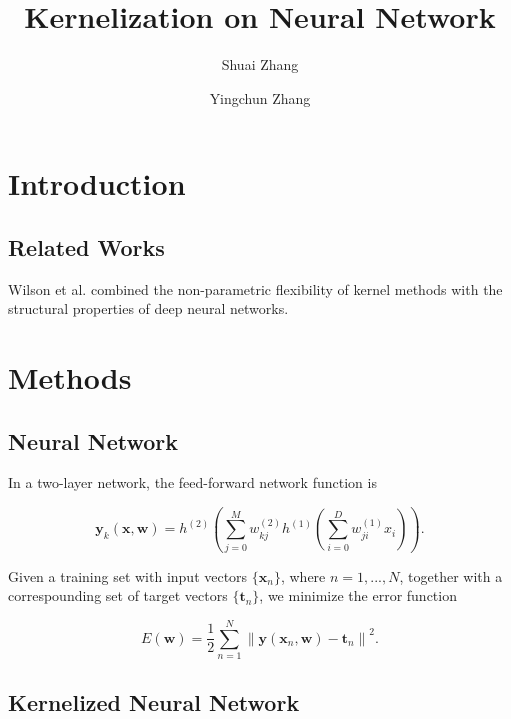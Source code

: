 \documentclass{article}
\begin{document}
\title{Kernelization on Neural Network}
\author{Shuai Zhang\and Yingchun Zhang}
\maketitle

\section{Introduction}

\subsection{Related Works}
Wilson et al. \cite{DBLP:journals/corr/WilsonHSX15} combined the non-parametric flexibility of kernel methods with the structural properties of deep neural networks.

\section{Methods}

\subsection{Neural Network}

In a two-layer network, the feed-forward network function is

\begin{equation}
\mathbf{y}_k(\mathbf{x}, \mathbf{w}) = h^{(2)}\left(\sum_{j=0}^{M}w_{kj}^{(2)}h^{(1)}\left(\sum_{i=0}^{D}w_{ji}^{(1)}x_i\right)\right).
\end{equation}

Given a training set with input vectors $\{\mathbf{x}_n\}$, where $n = 1, ..., N$, together with a correspounding set of target vectors $\{\mathbf{t}_n\}$, we minimize the error function

\begin{equation}
E(\mathbf{w}) = \frac{1}{2} \sum_{n=1}^{N} {\|\mathbf{y}(\mathbf{x}_n, \mathbf{w}) - \mathbf{t}_n\|}^2.
\end{equation}




\subsection{Kernelized Neural Network}
\end{document}
